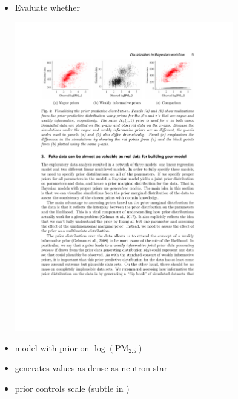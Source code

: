 \documentclass[10pt]{report}
\begin{document}
\begin{itemize}
\item Evaluate whether 
\begin{center}
\includegraphics[width=0.75\textwidth]{img/prior-predictive-eg.pdf}
\end{center}
\vspace*{-10pt}
\item {} model with prior on
  $\log(\textrm{PM}_{2.5})$
\item {} generates values as dense as neutron star
\item {} prior controls scale (subtle in )
\end{itemize}
\end{document}
